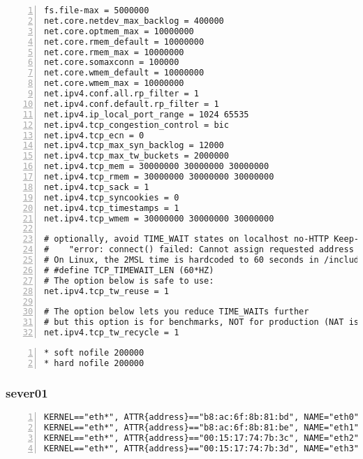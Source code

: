 \documentclass[Configuration]{subfiles}
\begin{document}
\begin{lstlisting}[frame=single,caption=Lines add to /etc/sysctl.conf,backgroundcolor=\color{gray},breaklines=true,numbers=left,]
fs.file-max = 5000000
net.core.netdev_max_backlog = 400000
net.core.optmem_max = 10000000
net.core.rmem_default = 10000000
net.core.rmem_max = 10000000
net.core.somaxconn = 100000
net.core.wmem_default = 10000000
net.core.wmem_max = 10000000
net.ipv4.conf.all.rp_filter = 1
net.ipv4.conf.default.rp_filter = 1
net.ipv4.ip_local_port_range = 1024 65535
net.ipv4.tcp_congestion_control = bic
net.ipv4.tcp_ecn = 0
net.ipv4.tcp_max_syn_backlog = 12000
net.ipv4.tcp_max_tw_buckets = 2000000
net.ipv4.tcp_mem = 30000000 30000000 30000000
net.ipv4.tcp_rmem = 30000000 30000000 30000000
net.ipv4.tcp_sack = 1
net.ipv4.tcp_syncookies = 0
net.ipv4.tcp_timestamps = 1
net.ipv4.tcp_wmem = 30000000 30000000 30000000    

# optionally, avoid TIME_WAIT states on localhost no-HTTP Keep-Alive tests:
#    "error: connect() failed: Cannot assign requested address (99)"
# On Linux, the 2MSL time is hardcoded to 60 seconds in /include/net/tcp.h:
# #define TCP_TIMEWAIT_LEN (60*HZ)
# The option below is safe to use:
net.ipv4.tcp_tw_reuse = 1

# The option below lets you reduce TIME_WAITs further
# but this option is for benchmarks, NOT for production (NAT issues)
net.ipv4.tcp_tw_recycle = 1
\end{lstlisting}

\begin{lstlisting}[frame=single,caption=Lines added to /etc/security/limits.conf,backgroundcolor=\color{gray},breaklines=true,numbers=left,]
* soft nofile 200000
* hard nofile 200000
\end{lstlisting}

\subsubsection{sever01}
\label{sec:server01_configuration}

\begin{lstlisting}[frame=single,caption=/etc/udev/rules.d/70-persistent-net.rules,backgroundcolor=\color{gray},breaklines=true,numbers=left,]
KERNEL=="eth*", ATTR{address}=="b8:ac:6f:8b:81:bd", NAME="eth0"
KERNEL=="eth*", ATTR{address}=="b8:ac:6f:8b:81:be", NAME="eth1"
KERNEL=="eth*", ATTR{address}=="00:15:17:74:7b:3c", NAME="eth2"
KERNEL=="eth*", ATTR{address}=="00:15:17:74:7b:3d", NAME="eth3"
\end{lstlisting}
\end{document}
